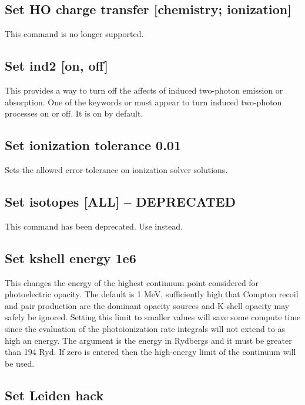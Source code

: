 \subsection{Set HO charge transfer [chemistry; ionization]}

This command is no longer supported.

\subsection{Set ind2 [on, off]}

This provides a way to turn off the affects of induced two-photon emission
or absorption.
One of the keywords  or  must appear
to turn induced
two-photon processes on or off.
It is on by default.

\subsection{Set ionization tolerance 0.01}

Sets the allowed error tolerance on ionization solver solutions.

\subsection{Set isotopes [ALL] -- DEPRECATED}

This command has been deprecated.
Use  instead.

\subsection{Set kshell energy 1e6}

This changes the energy of the highest continuum point considered for
photoelectric opacity.
The default is 1 MeV, sufficiently high that Compton
recoil and pair production are the dominant opacity sources and K-shell
opacity may safely be ignored.
Setting this limit to smaller values will
save some compute time since the evaluation of the photoionization rate
integrals will not extend to as high an energy.
The argument is the energy
in Rydbergs and it must be greater than 194 Ryd.
If zero is entered then
the high-energy limit of the continuum will be used.

\subsection{Set Leiden hack}

